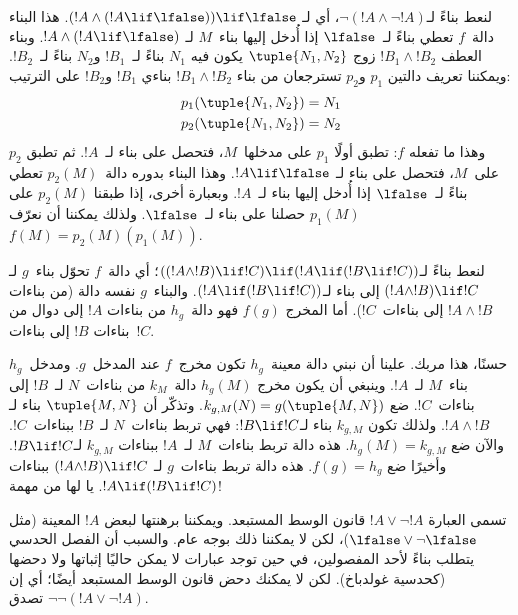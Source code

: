 \documentclass[../../../include/open-logic-section]{subfiles}
\begin{document}
\begin{ex}
لنعط بناءً لـ$\lnot(!A \land \lnot !A)$، أي لـ
$(!A \land (!A \lif \lfalse)) \lif \lfalse$. هذا البناء دالة~$f$
تعطي بناءً لـ~$\lfalse$ إذا أُدخل إليها بناء~$M$ لـ
$!A \land (!A \lif \lfalse)$. وبناء العطف $!B_1 \land !B_2$ زوج
$\tuple{N_1, N_2}$ يكون فيه $N_1$ بناءً لـ~$!B_1$ و$N_2$ بناءً
لـ~$!B_2$. ويمكننا تعريف دالتين $p_1$ و$p_2$ تسترجعان من بناء
$!B_1 \land !B_2$ بناءي $!B_1$ و$!B_2$ على الترتيب:
\begin{align*}
  p_1(\tuple{N_1, N_2}) &= N_1\\
  p_2(\tuple{N_1, N_2}) &= N_2
\end{align*}
وهذا ما تفعله $f$: تطبق أولًا $p_1$ على مدخلها~$M$، فتحصل على بناء
لـ~$!A$. ثم تطبق $p_2$ على~$M$، فتحصل على بناء لـ
$!A \lif \lfalse$. وهذا البناء بدوره دالة~$p_2(M)$ تعطي بناءً
لـ~$\lfalse$ إذا أُدخل إليها بناء لـ~$!A$. وبعبارة أخرى، إذا طبقنا
$p_2(M)$ على $p_1(M)$ حصلنا على بناء لـ~$\lfalse$. ولذلك يمكننا أن
نعرّف $f(M) = p_2(M)(p_1(M))$.
\end{ex}

\begin{ex}
لنعط بناءً لـ$((!A \land !B) \lif !C) \lif (!A \lif
(!B \lif !C))$؛ أي دالة~$f$ تحوّل بناء~$g$ لـ
$(!A \land !B) \lif !C$ إلى بناء لـ$(!A \lif (!B \lif !C))$.
والبناء~$g$ نفسه دالة (من بناءات $!A \land !B$ إلى بناءات~$!C$).
أما المخرج $f(g)$ فهو دالة~$h_g$ من بناءات $!A$ إلى دوال من بناءات
$!B$ إلى بناءات~$!C$.

حسنًا، هذا مربك. علينا أن نبني دالة معينة~$h_g$ تكون مخرج~$f$ عند
المدخل~$g$. ومدخل~$h_g$ بناء~$M$ لـ~$!A$. وينبغي أن يكون مخرج
$h_g(M)$ دالة~$k_M$ من بناءات~$N$ لـ~$!B$ إلى بناءات~$!C$. ضع
$k_{g,M}(N) = g(\tuple{M, N})$. وتذكّر أن $\tuple{M, N}$ بناء لـ
$!A \land !B$. ولذلك تكون $k_{g,M}$ بناء لـ$!B \lif !C$: فهي تربط
بناءات~$N$ لـ~$!B$ ببناءات~$!C$. والآن ضع $h_g(M) = k_{g,M}$. هذه
دالة تربط بناءات~$M$ لـ~$!A$ ببناءات $k_{g,M}$ لـ$!B \lif !C$.
وأخيرًا ضع $f(g) = h_g$. هذه دالة تربط بناءات~$g$ لـ
$(!A \land !B) \lif !C$ ببناءات $!A \lif (!B \lif !C)$. يا لها من
مهمة!{}
\end{ex}

تسمى العبارة $!A \lor \lnot !A$ قانون الوسط المستبعد. ويمكننا برهنتها
لبعض $!A$ المعينة (مثل $\lfalse \lor \lnot \lfalse$)، لكن لا يمكننا
ذلك بوجه عام. والسبب أن الفصل الحدسي يتطلب بناءً لأحد المفصولين، في
حين توجد عبارات لا يمكن حاليًا إثباتها ولا دحضها (كحدسية غولدباخ).
لكن لا يمكنك دحض قانون الوسط المستبعد أيضًا؛ أي إن
$\lnot \lnot (!A \lor \lnot !A)$ تصدق.
\end{document}
